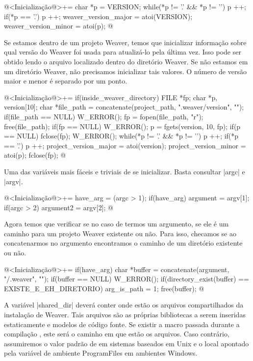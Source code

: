 {\iniciocodigo
@<Inicialização@>+=
{
  char *p = VERSION;
  while(*p != '.' && *p != '\0') p ++;
  if(*p == '.') p ++;
  weaver_version_major = atoi(VERSION);
  weaver_version_minor = atoi(p);
}
@
\fimcodigo


Se estamos dentro de um projeto Weaver, temos que inicializar
informação sobre qual versão do Weaver foi usada para atualizá-lo pela
última vez. Isso pode ser obtido lendo o arquivo
 localizado dentro do diretório Weaver. Se não
estamos em um diretório Weaver, não precisamos inicializar tais
valores. O número de versão maior e menor é separado por um ponto.

\iniciocodigo
@<Inicialização@>+=
if(inside_weaver_directory){
  FILE *fp;
  char *p, version[10];
  char *file_path = concatenate(project_path, ".weaver/version", "");
  if(file_path == NULL) W_ERROR();
  fp = fopen(file_path, "r");
  free(file_path);
  if(fp == NULL) W_ERROR();
  p = fgets(version, 10, fp);
  if(p == NULL){ fclose(fp); W_ERROR(); }
  while(*p != '.' && *p != '\0') p ++;
  if(*p == '.') p ++;
  project_version_major = atoi(version);
  project_version_minor = atoi(p);
  fclose(fp);
}
@
\fimcodigo


Uma das variáveis mais fáceis e triviais de se inicializar. Basta
consultar |argc| e |argv|.

\iniciocodigo
@<Inicialização@>+=
have_arg = (argc > 1);
if(have_arg) argument = argv[1];
if(argc > 2) argument2 = argv[2];
@
\fimcodigo


Agora temos que verificar se no caso de termos um argumento, se ele é
um caminho para um projeto Weaver existente ou não. Para isso,
checamos se ao concatenarmos  no argumento
encontramos o caminho de um diretório existente ou não.

\iniciocodigo
@<Inicialização@>+=
if(have_arg){
  char *buffer = concatenate(argument, "/.weaver", "");
  if(buffer == NULL) W_ERROR();
  if(directory_exist(buffer) == EXISTE_E_EH_DIRETORIO){
    arg_is_path = 1;
  }
  free(buffer);
}
@
\fimcodigo


A variável |shared_dir| deverá conter onde estão os arquivos
compartilhados da instalação de Weaver. Tais arquivos são as próprias
bibliotecas a serem inseridas estaticamente e modelos de código
fonte. Se existir a macro passada durante a
compilação , este será o caminho em que estão
os arquivos. Caso contrário, assumiremos o valor padrão
de  em sistemas baseados em Unix e
o local apontado pela variável de ambiente ProgramFiles em ambientes
Windows.

}
